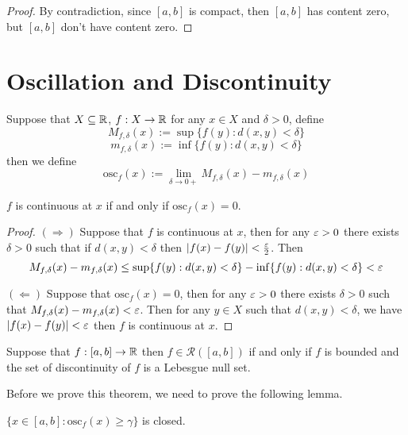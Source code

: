 \begin{proof}
  By contradiction, since $[a, b]$ is compact, then $[a, b]$ has content zero, 
  but $[a, b]$ don't have content zero.
\end{proof}

\section{Oscillation and Discontinuity}

\begin{definition}
  Suppose that $X \subseteq \mathbb R$, $f: X \to \mathbb R$ for any $x \in X$ and $\delta > 0$, define
  \[M_{f, \delta}(x) := \sup\{f(y) : d(x, y) < \delta\}\]
  \[m_{f, \delta}(x) := \inf\{f(y) : d(x, y) < \delta\}\]
then we define 
\[\mathrm{osc}_f(x) := \lim_{\delta\to0+} M_{f, \delta}(x) - m_{f, \delta}(x)\]
\end{definition}

\begin{lemma}
  $f$ is continuous at $x$ if and only if $\mathrm{osc}_f(x) = 0$.
\end{lemma}

\begin{proof}
  $(\Rightarrow)$ Suppose that $f$ is continuous at $x$, then for any $\varepsilon > 0$ there exists $\delta > 0$ such that
  if $d(x, y) < \delta$ then $|f(x) - f(y)| < \frac{\varepsilon}2$. Then
  \[M_{f, \delta}(x) - m_{f, \delta}(x) \le \sup\{f(y) : d(x, y) < \delta\} - \inf\{f(y) : d(x, y) < \delta\} < \varepsilon\]

  $(\Leftarrow)$ Suppose that $\mathrm{osc}_f(x) = 0$, then for any $\varepsilon > 0$ there exists $\delta > 0$ such that
  $M_{f, \delta}(x) - m_{f, \delta}(x) < \varepsilon$. Then for any $y \in X$ such that $d(x, y) < \delta$, we have
  $|f(x) - f(y)| < \varepsilon$ then $f$ is continuous at $x$.
\end{proof}

\begin{theorem}
  Suppose that $f: [a, b] \to \mathbb R$ then
  $f \in \mathcal{R}([a, b])$ if and only if $f$ is bounded and the set of discontinuity of $f$ is a Lebesgue null set.
\end{theorem}

Before we prove this theorem, we need to prove the following lemma.

\begin{lemma}
  $\{x \in [a, b]: \mathrm{osc}_f(x) \ge \gamma\}$ is closed.
\end{lemma}

